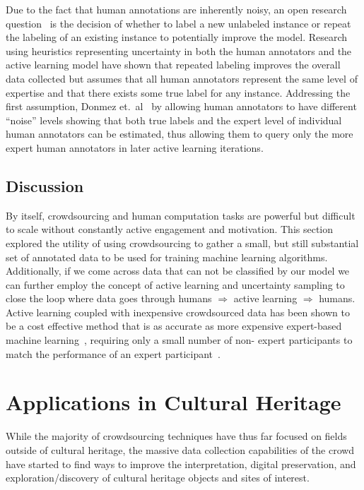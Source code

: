 \documentclass[10pt,twocolumn]{article}
\begin{document}
Due to the fact that human annotations are inherently noisy, an open 
research question~\cite{Settles2010} is the decision of whether to label a 
new unlabeled instance or repeat the labeling of an existing instance to 
potentially improve the model. Research~\cite{Sheng2008} using heuristics 
representing uncertainty in both the human annotators and the active 
learning model have shown that repeated labeling improves the overall data 
collected but assumes that all human annotators represent the same level of 
expertise and that there exists some true label for any instance. 
Addressing the first assumption, Donmez et.\ al~\cite{Donmez2009} by 
allowing human annotators to have different ``noise'' levels showing that 
both true labels and the expert level of individual human annotators can be 
estimated, thus allowing them to query only the more expert human 
annotators in later active learning iterations.


\subsection{Discussion}
By itself, crowdsourcing and human computation tasks are powerful but 
difficult to scale without constantly active engagement and motivation. This
section explored the utility of using crowdsourcing to gather a small, but still
substantial set of annotated data to be used for training machine learning
algorithms. Additionally, if we come across data that can not be classified by 
our model we can further employ the concept of active learning and uncertainty
sampling to close the loop where data goes through humans $\Rightarrow$ active 
learning $\Rightarrow$ humans. Active learning coupled with inexpensive 
crowdsourced data has been shown to be a cost effective method that is as 
accurate as more expensive expert-based machine 
learning~\cite{Barrington2012,Yan2011}, requiring only a small number of non-
expert participants to match the performance of an expert 
participant~\cite{Snow2008}.


\section{Applications in Cultural Heritage}
\label{sec:applications-heritage}
While the majority of crowdsourcing techniques have thus far focused on 
fields outside of cultural heritage, the massive data collection 
capabilities of the crowd have started to find ways to improve the 
interpretation, digital preservation, and exploration/discovery of cultural 
heritage objects and sites of interest.
\end{document}
